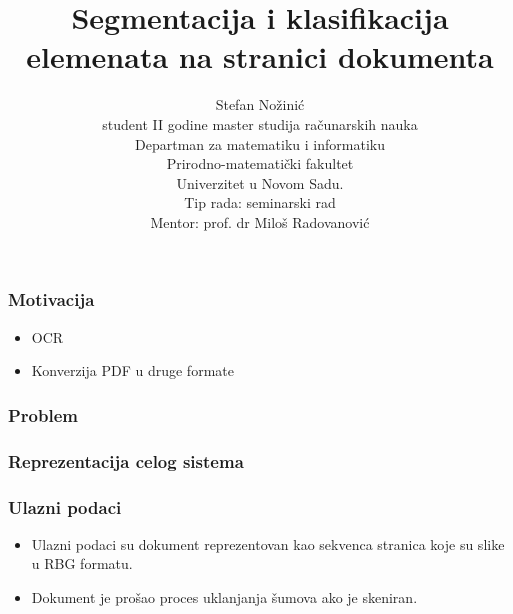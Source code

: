 \documentclass{beamer}
\begin{document}
\title{Segmentacija i klasifikacija elemenata na stranici dokumenta}
\author{Stefan Nožinić \\
student II godine master studija računarskih nauka \\
Departman za matematiku i informatiku \\
Prirodno-matematički fakultet \\
Univerzitet u Novom Sadu. \\
Tip rada: seminarski rad \\
Mentor: \MakeLowercase{prof. dr} Miloš Radovanović
}

\frame{
\titlepage
}




\begin{frame}
	\frametitle{Motivacija}
	\begin{itemize}
		\item OCR
		\item Konverzija PDF u druge formate 
	\end{itemize}

\end{frame}


\begin{frame}
	\frametitle{Problem}

\end{frame}


\begin{frame}
	\frametitle{Reprezentacija celog sistema}

\end{frame}

\begin{frame}
	\frametitle{Ulazni podaci}
	\begin{itemize}
		\item Ulazni podaci su dokument reprezentovan kao sekvenca stranica koje su slike u RBG formatu.
		\item Dokument je prošao proces uklanjanja šumova ako je skeniran. 
	\end{itemize}
\end{frame}
\end{document}
